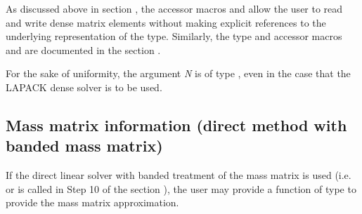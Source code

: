 \documentclass[letterpaper,10pt,english]{sphinxmanual}
\begin{document}
\begin{fulllineitems}
As discussed above in section {\hyperref[c_interface/User_supplied:cinterface-densejacobianfn]{\emph{}}},
the accessor macros  and  allow the user
to read and write dense matrix elements without making explicit
references to the underlying representation of the 
type. Similarly, the  type and accessor macros
 and  are documented in the section
{\hyperref[linear_solvers/index:linearsolvers]{\emph{}}}.

For the sake of uniformity, the argument \emph{N} is of type ,
even in the case that the LAPACK dense solver is to be used.

\end{fulllineitems}



\subsection{Mass matrix information (direct method with banded mass matrix)}
\label{c_interface/User_supplied:cinterface-bandmassfn}\label{c_interface/User_supplied:mass-matrix-information-direct-method-with-banded-mass-matrix}
If the direct linear solver with banded treatment of the mass matrix is
used (i.e. {\hyperref[c_interface/User_callable:c.ARKMassBand]{\emph{}}} or {\hyperref[c_interface/User_callable:c.ARKMassLapackBand]{\emph{}}} is
called in Step 10 of the section {\hyperref[c_interface/Skeleton:cinterface-skeleton]{\emph{}}}), the user
may provide a function of type {\hyperref[c_interface/User_supplied:c.ARKDlsBandMassFn]{\emph{}}} to provide
the mass matrix approximation.
\end{document}
